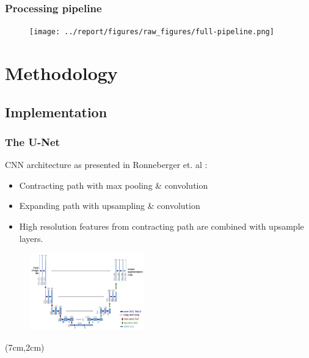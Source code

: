 \documentclass{beamer}
\begin{document}
\begin{frame}
    \frametitle{Processing pipeline}
    \begin{figure}
        \texttt{[image: ../report/figures/raw\_figures/full-pipeline.png]}
    \end{figure}
\end{frame}

\section{Methodology}
\subsection{Implementation} %

\begin{frame}
    \frametitle{The U-Net}
    CNN architecture as presented in Ronneberger et. al \cite{unet}:
    \begin{itemize}
        \item Contracting path with max pooling \& convolution
        \item Expanding path with upsampling \& convolution
        \item High resolution features from contracting path are combined with upsample layers.
    \end{itemize}
    \begin{figure}
        \includegraphics[width=5cm]{../report/figures/unet.png}
    \end{figure}
    \begin{textblock*}{5cm}(7cm,2cm) %
    \end{textblock*}

\end{frame}



\end{document}
